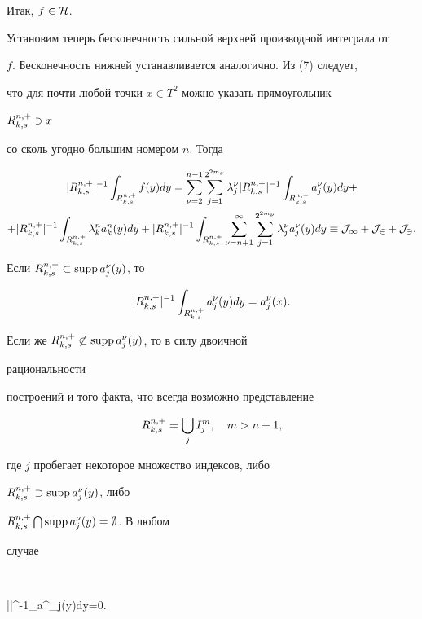 Итак, $f\in\cal H$.





Установим теперь бесконечность сильной верхней производной интеграла от


$f$. Бесконечность нижней устанавливается аналогично. Из (7) следует,


что для почти любой точки $x\in T^2$ можно указать прямоугольник


$R^{n,+}_{k,s}\owns x$


со сколь угодно большим номером $n$. Тогда


\begin{multline*}


|\myR{+}|^{-1}\int_{\myR{+}}f(y)dy=\sum^{n-1}_{\nu=2}


\sum^{2^{2m_\nu}}_{j=1}\lambda^\nu_j|\myR{+}|^{-1}


\int_{\myR{+}}a^\nu_j(y)dy+ \\


+|\myR{+}|^{-1}\int_{\myR{+}}\lambda^n_k a^n_k(y)dy+


|\myR{+}|^{-1}\int_{\myR{+}}\sum^\infty_{\nu=n+1}


\sum^{2^{2m_\nu}}_{j=1}\lambda^\nu_j a^\nu_j(y)dy


\equiv \cal J_1+\cal J_2+\cal J_3.


\end{multline*}


Если $R^{n,+}_{k,s}\subset\operatorname{supp} a^\nu_j(y)$, то


$$


|\myR{+}|^{-1}\int_{\myR{+}}a^\nu_j(y)dy=a^\nu_j(x).


$$


Если же $R^{n,+}_{k,s}\not\subset\operatorname{supp} a^\nu_j(y)$, то в силу двоичной


рациональности


построений и того факта, что всегда возможно представление


$$


\myR{+}=\bigcup_j I^m_j,\quad m>n+1,


$$


где $j$ пробегает некоторое множество индексов, либо


$R^{n,+}_{k,s}\supset\operatorname{supp} a^\nu_j(y)$, либо


$R^{n,+}_{k,s}\bigcap\operatorname{supp} a^\nu_j(y)=\emptyset$. В любом


случае


$$


|\myR{+}|^{-1}\int_{\myR{+}}a^\nu_j(y)dy=0.


